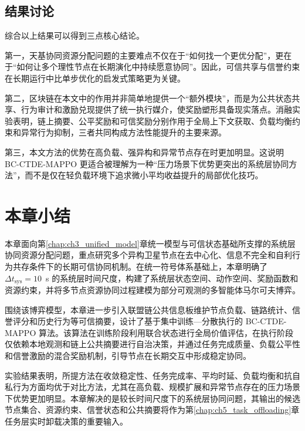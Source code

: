 \subsection{结果讨论}

综合以上结果可以得到三点核心结论。

第一，天基协同资源分配问题的主要难点不仅在于“如何找一个更优分配”，更在于“如何让多个理性节点在长期演化中持续愿意协同”。因此，可信共享与信誉约束在长期运行中比单步优化的启发式策略更为关键。

第二，区块链在本文中的作用并非简单地提供一个“额外模块”，而是为公共状态共享、行为审计和激励兑现提供了统一执行媒介，使奖励塑形具备现实落点。消融实验表明，链上摘要、公平奖励和可信奖励分别作用于全局上下文获取、负载均衡约束和异常行为抑制，三者共同构成方法性能提升的主要来源。

第三，本文方法的优势在高负载、强异构和异常节点存在时更加明显。这说明 BC-CTDE-MAPPO 更适合被理解为一种“压力场景下优势更突出的系统层协同方法”，而不是仅在轻负载环境下追求微小平均收益提升的局部优化技巧。

\section{本章小结}

本章面向第\ref{chap:ch3_unified_model}章统一模型与可信状态基础所支撑的系统层协同资源分配问题，重点研究多个异构卫星节点在去中心化、信息不完全和自利行为共存条件下的长期可信协同机制。在统一符号体系基础上，本章明确了 $\Delta t_{\mathrm{sys}}=10$~s 的系统层时间尺度，构建了系统层状态空间、动作空间、奖励函数和资源约束，并将多节点资源协同过程建模为部分可观测的多智能体马尔可夫博弈。

围绕该博弈模型，本章进一步引入联盟链公共信息板维护节点负载、链路统计、信誉评分和历史行为等可信摘要，设计了基于集中训练—分散执行的 BC-CTDE-MAPPO 算法。该算法在训练阶段利用联合状态进行全局价值评估，在执行阶段仅依赖本地观测和链上公共摘要进行自治决策，并通过任务完成质量、负载公平性和信誉激励的混合奖励机制，引导节点在长期交互中形成稳定协同。

实验结果表明，所提方法在收敛稳定性、任务完成率、平均时延、负载均衡和抗自私行为方面均优于对比方法，尤其在高负载、规模扩展和异常节点存在的压力场景下优势更加明显。本章解决的是较长时间尺度下的系统层协同问题，其输出的候选节点集合、资源约束、信誉状态和公共摘要将作为第\ref{chap:ch5_task_offloading}章任务层实时卸载决策的重要输入。
